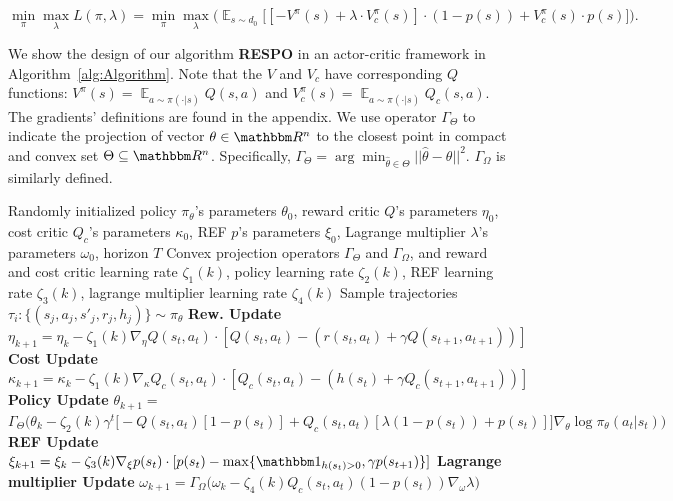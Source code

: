 \documentclass{article}
\theoremstyle{definition}
\DeclareMathOperator*{\E}{\mathbb{E}}
\begin{document}
\vspace{-18pt}
\begin{equation}
\label{eqn:L_loss}
\min_\pi \max_\lambda L(\pi, \lambda) = 
\min_\pi \max_\lambda\bigg(\E_{s\sim d_0}\biggl[ [-V^\pi(s) + \lambda\cdot V^\pi_c(s)]\cdot (1-p(s)) + V^\pi_c(s)\cdot p(s)\biggr]\bigg).
\end{equation}

\vspace{-8pt}
We show the design of our algorithm \textbf{RESPO} in an actor-critic framework in Algorithm~\ref{alg:Algorithm}. Note that the $V$ and $V_c$ have corresponding $Q$ functions: $V^\pi(s)=\E_{a\sim\pi(\cdot | s)}Q(s,a)$ and $V^\pi_c(s)=\E_{a\sim\pi(\cdot | s)}Q_c(s,a)$. The gradients' definitions are found in the appendix. We use operator $\Gamma_\Theta$ to indicate the projection of vector $\theta\in \mathbbm R^n$ to the closest point in compact and convex set $\Theta\subseteq\mathbbm R^n$. Specifically, $\Gamma_\Theta=\arg\min_{\hat{\theta}\in \Theta}|| \hat{\theta} - \theta||^2$. $\Gamma_\Omega$ is similarly defined.


\begin{algorithm}[t]
\caption{RESPO Actor Critic}
\label{alg:Algorithm}
\begin{algorithmic}[1]
\Require Randomly initialized policy $\pi_\theta$'s parameters $\theta_0$, reward critic $Q$'s parameters $\eta_0$, cost critic $Q_c$'s parameters $\kappa_0$, REF $p$'s parameters $\xi_0$, Lagrange multiplier $\lambda$'s parameters $\omega_0$, horizon $T$
\Require Convex projection operators $\Gamma_\Theta$ and $\Gamma_\Omega$, and reward and cost critic learning rate $\zeta_1(k)$, policy learning rate $\zeta_2(k)$, REF learning rate $\zeta_3(k)$, lagrange multiplier learning rate $\zeta_4(k)$
\State Sample trajectories $\tau_i: \{(s_j,a_j,s'_j,r_j,h_j)\} \sim \pi_{\theta}$
\State \textbf{Rew. Update} $\eta_{k+1}=\eta_{k}-\zeta_1(k)\nabla_\eta Q(s_t,a_t)\cdot [Q(s_t, a_t) - (r(s_t, a_t) + \gamma Q(s_{t+1}, a_{t+1}))]$
\State \textbf{Cost Update} $\kappa_{k+1}=\kappa_{k}-\zeta_1(k)\nabla_\kappa Q_c(s_t,a_t)\cdot [Q_c(s_t, a_t) - (h(s_t) + \gamma Q_c(s_{t+1}, a_{t+1}))]$
\State \textbf{Policy Update} $\theta_{k+1}=$
\State $\Gamma_\Theta \bigg(\theta_k - \zeta_2(k)\gamma^t \bigg[-Q(s_t,a_t) [1 - p(s_t)]
    +Q_c(s_t,a_t) [\lambda (1 - p(s_t)) + p(s_t)]\bigg] \nabla_\theta \log\pi_\theta (a_t | s_t)\bigg)$
\State \textbf{REF Update} $\xi_{k+1}=\xi_{k}-\zeta_3(k)\nabla_\xi p(s_t)\cdot [p(s_t) - \max\{\mathbbm 1_{h(s_t)>0}, \gamma p(s_{t+1})\}]$
\State \textbf{Lagrange multiplier Update} $\omega_{k+1}=\Gamma_\Omega \big(\omega_k - \zeta_4(k)Q_c(s_t,a_t)(1-p(s_t)) \nabla_\omega \lambda\big)$ 
\EndFor
\EndFor
\end{algorithmic}
\end{algorithm}
\end{document}

